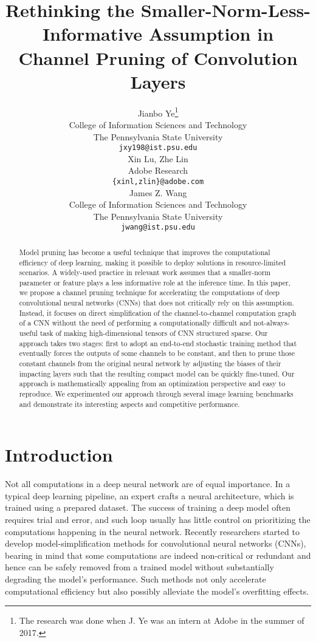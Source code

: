 \documentclass{article} %
\title{Rethinking the Smaller-Norm-Less-\hfill\break Informative Assumption in Channel Pruning of Convolution Layers}
\author{Jianbo Ye\thanks{The research was done when J. Ye was an intern at Adobe in the summer of 2017.} \\
College of Information Sciences and Technology\\
The Pennsylvania State University\\
\texttt{jxy198@ist.psu.edu} \\
\And
Xin Lu, Zhe Lin \\
Adobe Research \\
\texttt{\{xinl,zlin\}@adobe.com} \\
\AND
James Z. Wang \\
College of Information Sciences and Technology \\
The Pennsylvania State University\\
\texttt{jwang@ist.psu.edu}
}
\begin{document}
\maketitle

\begin{abstract}
Model pruning has become a useful technique that improves the computational
efficiency of deep learning, making it possible to deploy solutions in resource-limited scenarios. A widely-used practice in relevant work assumes
that a smaller-norm parameter or feature plays a less informative role at the inference time. 
In this paper, we propose a channel pruning technique for accelerating the 
computations of deep convolutional neural networks (CNNs) that does not critically rely on this assumption. Instead, it 
focuses on direct simplification of the channel-to-channel 
computation graph of a CNN without the need of 
 performing a computationally difficult and not-always-useful task of
making high-dimensional tensors of CNN structured sparse. 
Our approach takes two stages: first to adopt an end-to-end stochastic training
method that eventually forces the outputs of some channels to be constant, and then  
to prune those constant channels from the original neural network by 
adjusting the biases of their impacting layers such that the resulting compact model 
can be quickly fine-tuned. 
Our approach is mathematically appealing from an optimization perspective and easy to reproduce. We experimented our approach
through several image learning benchmarks and demonstrate 
its interesting aspects and competitive performance.
\end{abstract}

\section{Introduction}
Not all computations in a deep neural network are of equal importance. In a typical 
deep learning pipeline, an expert crafts a neural architecture, which is trained using
a prepared dataset. The success of training a deep model often requires trial and error,
and such loop usually has little control on prioritizing the computations happening in
the neural network. Recently researchers started to develop model-simplification methods
for convolutional neural networks (CNNs), bearing in mind that some computations are indeed  non-critical
or redundant and hence can be safely removed from a trained model without substantially degrading
the model's performance. Such methods not only accelerate computational 
efficiency but also possibly alleviate the model's overfitting effects. 
\end{document}
